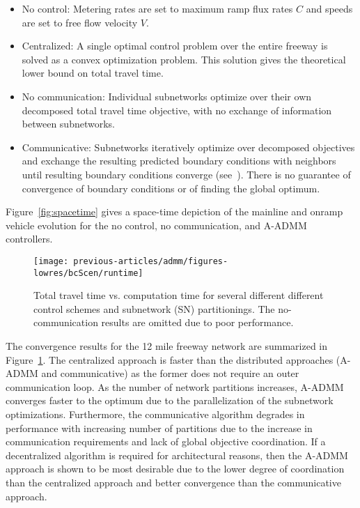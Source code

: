 \begin{itemize}
  \item No control: Metering rates are set to maximum ramp flux rates $C$ and speeds are set to free flow velocity $V$.
  \item Centralized: A single optimal control problem over the entire freeway is solved as a convex optimization problem. This solution gives the theoretical lower bound on total travel time.
  \item No communication: Individual subnetworks optimize over their own decomposed total travel time objective, with no exchange of information between subnetworks.
  \item Communicative: Subnetworks iteratively optimize over decomposed objectives and exchange the resulting predicted boundary conditions with neighbors until resulting boundary conditions converge (see~\cite{Frejo2011}). There is no guarantee of convergence of boundary conditions or of finding the global optimum.
\end{itemize}

Figure~\ref{fig:spacetime} gives a space-time depiction of the mainline and onramp vehicle evolution for the no control, no communication, and A-ADMM controllers.

\begin{figure}[t]
  \centering
  \texttt{[image: previous-articles/admm/figures-lowres/bcScen/runtime]}
  \caption{Total travel time vs. computation time for several different different control schemes and subnetwork (SN) partitionings. The no-communication results are omitted due to poor performance.}
  \label{fig:runtime}
\end{figure}

The convergence results for the 12 mile freeway network are summarized in Figure~\ref{fig:runtime}. The centralized approach is faster than the distributed approaches (A-ADMM and communicative) as the former does not require an outer communication loop. As the number of network partitions increases, A-ADMM converges faster to the optimum due to the parallelization of the subnetwork optimizations. Furthermore, the communicative algorithm degrades in performance with increasing number of partitions due to the increase in communication requirements and lack of global objective coordination. If a decentralized algorithm is required for architectural reasons, then the A-ADMM approach is shown to be most desirable due to the lower degree of coordination than the centralized approach and better convergence than the communicative approach.


